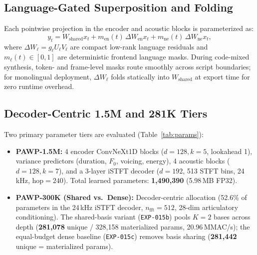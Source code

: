 \subsection{Language-Gated Superposition and Folding}
Each pointwise projection in the encoder and acoustic blocks is parameterized as:
\begin{equation}
  y_t = W_{\text{shared}} x_t + m_{\text{en}}(t)\,\Delta W_{\text{en}} x_t + m_{\text{ne}}(t)\,\Delta W_{\text{ne}} x_t,
\end{equation}
where $\Delta W_{\ell} = g_\ell U_\ell V_\ell$ are compact low-rank language residuals and $m_\ell(t) \in [0,1]$ are deterministic frontend language masks. During code-mixed synthesis, token- and frame-level masks route smoothly across script boundaries; for monolingual deployment, $\Delta W_\ell$ folds statically into $W_{\text{shared}}$ at export time for zero runtime overhead.

\subsection{Decoder-Centric 1.5M and 281K Tiers}
Two primary parameter tiers are evaluated (Table~\ref{tab:params}):
\begin{itemize}
  \item \textbf{PAWP-1.5M:} 4 encoder ConvNeXt1D blocks ($d=128, k=5$, lookahead 1), variance predictors (duration, $F_0$, voicing, energy), 4 acoustic blocks ($d=128, k=7$), and a 3-layer iSTFT decoder ($d=192$, 513 STFT bins, 24\,kHz, $\text{hop}=240$). Total learned parameters: \textbf{1,490,390} (5.98\,MB FP32).
  \item \textbf{PAWP-300K (Shared vs.\ Dense):} Decoder-centric allocation (52.6\% of parameters in the 24\,kHz iSTFT decoder, $n_{\text{fft}}=512$, 28-dim articulatory conditioning). The shared-basis variant (\texttt{EXP-015b}) pools $K=2$ bases across depth (\textbf{281,078} unique / 328,158 materialized params, 20.96\,MMAC/s); the equal-budget dense baseline (\texttt{EXP-015c}) removes basis sharing (\textbf{281,442} unique = materialized params).
\end{itemize}
